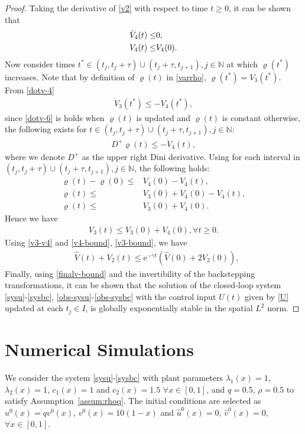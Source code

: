 \documentclass[letterpaper, 10 pt, conference]{ieeeconf}
\begin{document}
\begin{proof}
    Taking the derivative of \eqref{v2} with respect to time $t\geq0$, it can be shown that 
    \begin{align}
        \dot V_4(t) \leq& 0,\notag\\
        V_4(t) \leq& V_4(0).\label{v4-bound}
    \end{align}
    Now consider times $t^*\in(t_j,t_j+\tau)\cup(t_j+\tau,t_{j+1}),j\in\mathbb{N}$ at which $\varrho(t^*)$ increases. Note that by definition of $\varrho(t)$ in \eqref{varrho}, $\varrho(t^*) = V_3(t^*)$. From \eqref{dotv-4}
    \begin{align}
        \dot V_3(t^*) \leq -\dot V_4(t^*), \label{dotv-6}
    \end{align}
    since \eqref{dotv-6} is holds when $\varrho(t)$ is updated and $\varrho(t)$ is constant otherwise, the following exists for $t\in(t_j,t_j+\tau)\cup(t_j+\tau,t_{j+1}),j\in\mathbb{N}$:
    \begin{align}
        D^+ \varrho(t) \leq -\dot V_4(t),
    \end{align}
    where we denote $D^+$ as the upper right Dini derivative. Using \cite[Lemma 3.4]{khalil2002nonlinear} for each interval in $(t_j,t_j+\tau)\cup(t_j+\tau,t_{j+1}),j\in\mathbb{N}$, the following holds:
    \begin{align*}
        \varrho(t) - \varrho(0) \leq& V_4(0) - V_4(t),\\
        \varrho(t)\leq& V_3(0) + V_4(0) -V_4(t),\\
        \varrho(t)\leq& V_3(0) + V_4(0).
    \end{align*}
    Hence we have
    \begin{align}
        V_3(t) \leq V_3(0) + V_4(0), \forall t\geq0.\label{v3-bound}
    \end{align}
    Using \eqref{v3-v4} and \eqref{v4-bound}, \eqref{v3-bound}, we have
    \begin{align}
        &\hat V(t) + V_2(t) \leq \mathrm{e}^{-\gamma t}(\hat V(0) + 2V_2(0)),\label{finalv-bound}
    \end{align}
    Finally, using \eqref{finalv-bound} and the invertibility of the backstepping transformations, it can be shown that the solution of the closed-loop system \eqref{sysu}-\eqref{sysbc}, \eqref{obs-sysu}-\eqref{obs-sysbc} with the control input $U(t)$ given by \eqref{U} updated at each $t_j\in I$, is globally exponentially stable in the spatial $L^2$ norm.
\end{proof}
\section{Numerical Simulations}\label{sec:simulations}
We consider the system \eqref{sysu}-\eqref{sysbc} with plant parameters $\lambda_1(x)=1$, $\lambda_2(x)=1$, $c_1(x)=1$ and $c_2(x)=1.5$ $\forall x\in[0,1]$, and $q=0.5$, $\rho=0.5$ to satisfy Assumption~\ref{assum:rhoq}. The initial conditions are selected as $u^0(x)=qv^0(x)$, $v^0(x)=10(1-x)$ and $\hat u^0(x)=0$, $\hat v^0(x)=0$, $\forall x\in[0,1]$. 
\end{document}
